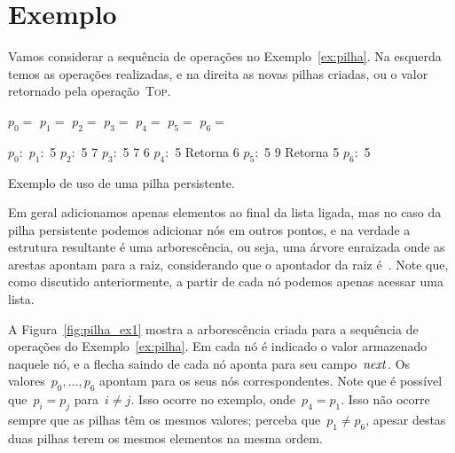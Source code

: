 \documentclass[main.tex]{subfiles}
\begin{document}
\section{Exemplo}

Vamos considerar a sequência de operações no Exemplo~\ref{ex:pilha}. Na esquerda temos as operações realizadas, e na direita as novas pilhas criadas, ou o valor retornado pela operação~\textsc{Top}.

\begin{table}
\centering

\begin{subalgorithm}{0.4\textwidth}
\begin{algorithmic}

\State $p_0 =$ 
\State $p_1 =$ 
\State $p_2 =$ 
\State $p_3 =$ 
\State $p_4 =$ 
\State {}
\State $p_5 =$ 
\State {}
\State $p_6 =$ 

\end{algorithmic}
\end{subalgorithm} \vrule
\begin{subalgorithm}{0.4\textwidth}
\begin{algorithmic}

\State $p_0:$
\State $p_1:$ 5
\State $p_2:$ 5 7
\State $p_3:$ 5 7 6
\State $p_4:$ 5
\State Retorna 6
\State $p_5:$ 5 9
\State Retorna 5
\State $p_6:$ 5

\end{algorithmic}
\end{subalgorithm}
\caption{Exemplo de uso de uma pilha persistente.} \label{ex:pilha}
\end{table}

Em geral adicionamos apenas elementos ao final da lista ligada, mas no caso da pilha persistente podemos adicionar nós em outros pontos, e na verdade a estrutura resultante é uma arborescência, ou seja, uma árvore enraizada onde as arestas apontam para a raiz, considerando que o apontador da raiz é~. Note que, como discutido anteriormente, a partir de cada nó podemos apenas acessar uma lista.

A Figura~\ref{fig:pilha_ex1} mostra a arborescência criada para a sequência de operações do Exemplo~\ref{ex:pilha}. Em cada nó é indicado o valor armazenado naquele nó, e a flecha saindo de cada nó aponta para seu campo~$\mathit{next}$. Os valores~$p_0, \ldots, p_6$ apontam para os seus nós correspondentes. Note que é possível que~${p_i = p_j}$ para~${i \neq j}$. Isso ocorre no exemplo, onde~$p_4 = p_1$. Isso não ocorre sempre que as pilhas têm os mesmos valores; perceba que~$p_1 \neq p_6$, apesar destas duas pilhas terem os mesmos elementos na mesma ordem.
\end{document}
